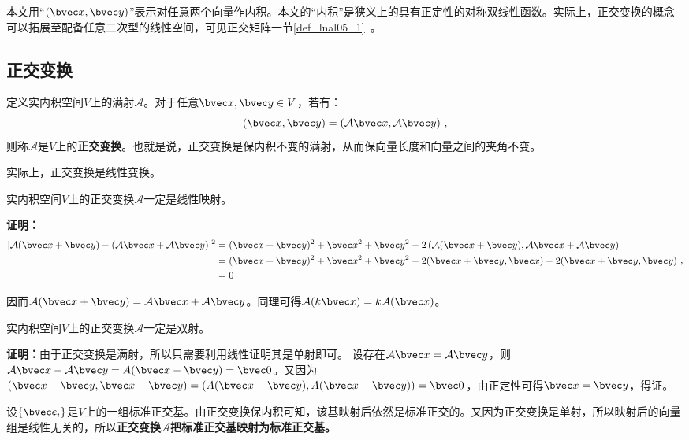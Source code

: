 
本文用“$(\bvec x,\bvec y)$”表示对任意两个向量作内积。本文的“内积”是狭义上的具有正定性的对称双线性函数。实际上，正交变换的概念可以拓展至配备任意二次型的线性空间，可见正交矩阵一节\autoref{def_lnal05_1}~。
\subsection{正交变换}
\begin{definition}{}\label{def_ortho_1}
定义实内积空间$V$上的满射$\mathcal A$。对于任意$\bvec x,\bvec y\in V$，若有：
\begin{equation}
(\bvec x,\bvec y)=(\mathcal A \bvec x,\mathcal A \bvec y)~,
\end{equation}
则称$\mathcal A$是$V$上的\textbf{正交变换}。也就是说，正交变换是保内积不变的满射，从而保向量长度和向量之间的夹角不变。
\end{definition}
实际上，正交变换是线性变换。
\begin{theorem}{}\label{the_ortho_1}
实内积空间$V$上的正交变换$\mathcal A$一定是线性映射。
\end{theorem}
\textbf{证明：}
\begin{equation}
\begin{aligned}
|\mathcal A(\bvec x+\bvec y)-(\mathcal A\bvec x+\mathcal A\bvec y)|^2&=(\bvec x+\bvec y)^2+\bvec x^2+\bvec y^2-2\left(\mathcal A(\bvec x+\bvec y),\mathcal A\bvec x+\mathcal A\bvec y\right)\\
&=(\bvec x+\bvec y)^2+\bvec x^2+\bvec y^2-2(\bvec x+\bvec y,\bvec x)-2(\bvec x+\bvec y,\bvec y)\\
&=0
\end{aligned}
~,\end{equation}

因而$\mathcal A(\bvec x+\bvec y)=\mathcal A\bvec x+\mathcal A\bvec y$。同理可得$\mathcal A(k\bvec x)=k\mathcal A(\bvec x)$。

\begin{theorem}{}
实内积空间$V$上的正交变换$\mathcal A$一定是双射。
\end{theorem}
\textbf{证明：}由于正交变换是满射，所以只需要利用线性证明其是单射即可。
设存在$\mathcal A\bvec x=\mathcal A\bvec y$，则$\mathcal A\bvec x-\mathcal A\bvec y=A(\bvec x-\bvec y)=\bvec 0$。又因为$(\bvec x-\bvec y,\bvec x-\bvec y)=(A(\bvec x-\bvec y),A(\bvec x-\bvec y))=\bvec 0$，由正定性可得$\bvec x=\bvec y$，得证。

设$\{\bvec e_i\}$是$V$上的一组标准正交基。由正交变换保内积可知，该基映射后依然是标准正交的。又因为正交变换是单射，所以映射后的向量组是线性无关的，所以\textbf{正交变换}$\mathcal A$\textbf{把标准正交基映射为标准正交基。}

